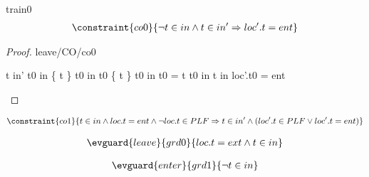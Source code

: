 \documentclass[12pt]{amsart}
\begin{document}
\begin{machine}{train0}
%
\begin{align*}
\constraint{co0}
{	\neg t \in in \land t \in in' \implies  loc'.t = ent } %
\end{align*}
%
\begin{proof}{leave/CO/co0}
	\begin{calculation}
		t \in in' 
	\hint{=}{ \ref{a0} }
		t0 \in in \setminus \{ t \} 
		t0 \in in \land \neg t0 \in \{ t \} 
		t0 \in in \land \neg t0 = t 
		t0 \in in \land \false
		\false
		\neg t \in in \implies  loc'.t0 = ent
	\end{calculation}
\end{proof}
%
\begin{align*}
\constraint{co1}
{	 t \in in \land loc.t = ent  \land \neg loc.t \in PLF 
\implies t \in in' \land (loc'.t \in PLF \lor loc'.t = ent)	}
\end{align*}


%

\begin{align*}
\evguard{leave}{grd0}
{	loc.t = ext \land t \in in	}
\end{align*}

\begin{align*}
\evguard{enter}{grd1}
{	\neg t \in in	}
\end{align*}


\end{machine}
\end{document}
